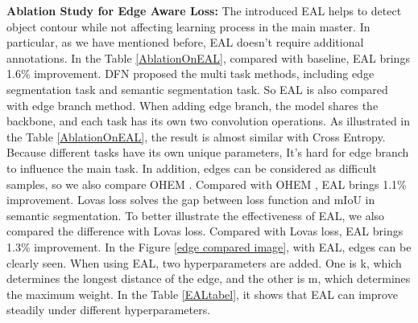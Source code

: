 \documentclass[final]{cvpr}
\begin{document}
\textbf{Ablation Study for Edge Aware Loss: } The introduced EAL helps to detect object contour while not affecting learning process in the main master. In particular, as we have mentioned before, EAL doesn't require additional annotations. In the Table \ref{AblationOnEAL}, compared with baseline, EAL brings 1.6\% improvement. DFN \cite{DFN} proposed the multi task methods, including edge segmentation task and semantic segmentation task. So EAL is also compared with edge branch method. When adding edge branch, the model shares the backbone, and each task has its own two convolution operations. As illustrated in the Table \ref{AblationOnEAL}, the result is almost similar with Cross Entropy. Because different tasks have its own unique parameters, It's hard for edge branch to influence the main task. In addition, edges can be considered as difficult samples, so we also compare OHEM \cite{Shrivastava2016Training, Wu2016Wider}. Compared with OHEM \cite{Shrivastava2016Training, Wu2016Wider}, EAL brings 1.1\% improvement. Lovas loss solves the gap between loss function and mIoU in semantic segmentation. To better illustrate the effectiveness of EAL, we also compared the difference with Lovas loss. Compared with Lovas loss, EAL brings 1.3\% improvement. In the Figure \ref{edge compared image}, with EAL, edges can be clearly seen. When using EAL, two hyperparameters are added. One is k, which determines the longest distance of the edge, and the other is m, which determines the maximum weight. In the Table \ref{EALtabel}, it shows that EAL can improve steadily under different hyperparameters.


\begin{table}[t]
\begin{center}
\end{center}
\caption{In order to demonstrate the influence of the different hyperparameters, experiments are conduct. Except that backbone is replaced with Xception41, the rest of baseline is the same as deeplabv3+.}
\label{EALtabel}
\vspace{-1em}
\end{table}
\end{document}
